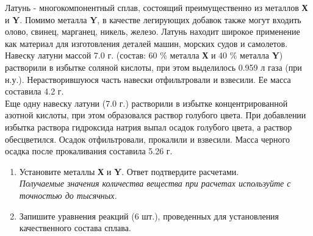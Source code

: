 Латунь - многокомпонентный сплав, состоящий преимущественно из металлов \textbf{Х} и \textbf{Y}. Помимо металла \textbf{Y}, в качестве легирующих добавок также могут входить олово, свинец, марганец, никель, железо. Латунь находит широкое применение как материал для изготовления деталей машин, морских судов и самолетов.\\
Навеску латуни массой 7.0 г. (состав: 60 \% металла \textbf{Х} и 40 \% металла \textbf{Y}) растворили в избытке соляной кислоты, при этом выделилось 0.959 л газа (при н.у.). Нерастворившуюся часть навески отфильтровали и взвесили. Ее масса составила 4.2 г.\\
Еще одну навеску латуни (7.0 г.) растворили в избытке концентрированной азотной кислоты, при этом образовался раствор голубого цвета. При добавлении избытка раствора гидроксида натрия выпал осадок голубого цвета, а раствор обесцветился. Осадок отфильтровали, прокалили и взвесили. Масса черного осадка после прокаливания составила 5.26 г.
\begin{enumerate}
\item Установите металлы \textbf{Х} и \textbf{Y}. Ответ подтвердите расчетами.\\
\textit{Получаемые значения количества вещества при расчетах используйте с точностью до тысячных.}
\item Запишите уравнения реакций (6 шт.), проведенных для установления качественного состава сплава.
\end{enumerate}
